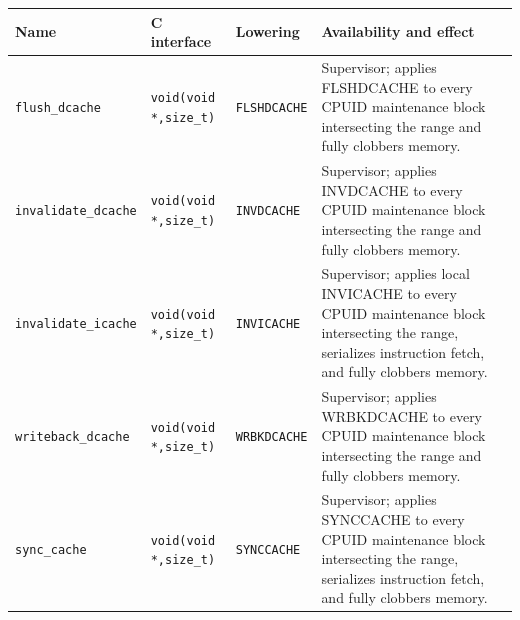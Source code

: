 \begingroup\footnotesize
\setlength{\tabcolsep}{2pt}
\begin{longtable}{@{}p{1.45in}p{1.3in}p{0.9in}p{1.95in}@{}}
\toprule
\textbf{Name} & \textbf{C interface} & \textbf{Lowering} & \textbf{Availability and effect}\\
\midrule
\endhead
\texttt{flush\_dcache} & \texttt{void(void *,size\_t)} & \texttt{FLSHDCACHE} & Supervisor; applies FLSHDCACHE to every CPUID maintenance block intersecting the range and fully clobbers memory.\\
\texttt{invalidate\_dcache} & \texttt{void(void *,size\_t)} & \texttt{INVDCACHE} & Supervisor; applies INVDCACHE to every CPUID maintenance block intersecting the range and fully clobbers memory.\\
\texttt{invalidate\_icache} & \texttt{void(void *,size\_t)} & \texttt{INVICACHE} & Supervisor; applies local INVICACHE to every CPUID maintenance block intersecting the range, serializes instruction fetch, and fully clobbers memory.\\
\texttt{writeback\_dcache} & \texttt{void(void *,size\_t)} & \texttt{WRBKDCACHE} & Supervisor; applies WRBKDCACHE to every CPUID maintenance block intersecting the range and fully clobbers memory.\\
\texttt{sync\_cache} & \texttt{void(void *,size\_t)} & \texttt{SYNCCACHE} & Supervisor; applies SYNCCACHE to every CPUID maintenance block intersecting the range, serializes instruction fetch, and fully clobbers memory.\\
\bottomrule
\end{longtable}
\endgroup
